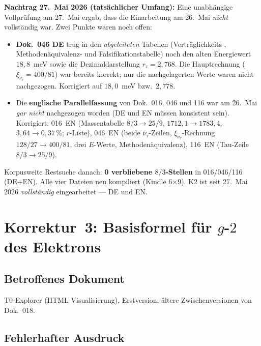 \medskip
\noindent\textbf{Nachtrag 27.~Mai 2026 (tatsächlicher Umfang):} Eine
unabhängige Vollprüfung am 27.~Mai ergab, dass die Einarbeitung am 26.~Mai
\emph{nicht} vollständig war. Zwei Punkte waren noch offen:
\begin{itemize}
  \item \textbf{Dok.~046 DE} trug in den \emph{abgeleiteten} Tabellen
        (Verträglichkeits-, Methodenäquivalenz- und Falsifikationstabelle)
        noch den alten Energiewert $18{,}8$~meV sowie die Dezimaldarstellung
        $r_\tau = 2{,}768$. Die Hauptrechnung ($\xi_{\nu_\tau} = 400/81$) war
        bereits korrekt; nur die nachgelagerten Werte waren nicht nachgezogen.
        Korrigiert auf $18{,}0$~meV bzw.\ $2{,}778$.
  \item Die \textbf{englische Parallelfassung} von Dok.~016, 046 und 116 war
        am 26.~Mai \emph{gar nicht} nachgezogen worden (DE und EN müssen
        konsistent sein). Korrigiert: 016~EN (Massentabelle $8/3 \to 25/9$,
        $1712{,}1 \to 1783{,}4$, $3{,}64 \to 0{,}37\,\%$; $r$-Liste),
        046~EN (beide $\nu_\tau$-Zeilen, $\xi_{\nu_\tau}$-Rechnung
        $128/27 \to 400/81$, drei $E$-Werte, Methodenäquivalenz),
        116~EN (Tau-Zeile $8/3 \to 25/9$).
\end{itemize}
\noindent Korpusweite Restsuche danach: \textbf{0 verbliebene $8/3$-Stellen}
in 016/046/116 (DE+EN). Alle vier Dateien neu kompiliert (Kindle 6×9).
K2 ist seit 27.~Mai 2026 \emph{vollständig} eingearbeitet --- DE und EN.

\section{\texorpdfstring{Korrektur~3: Basisformel für $g$-$2$ des Elektrons}{Korrektur 3: Basisformel fuer g-2 des Elektrons}}

\subsection*{Betroffenes Dokument}

T0-Explorer (HTML-Visualisierung), Erstversion; ältere Zwischenversionen
von Dok.~018.

\subsection*{Fehlerhafter Ausdruck}

